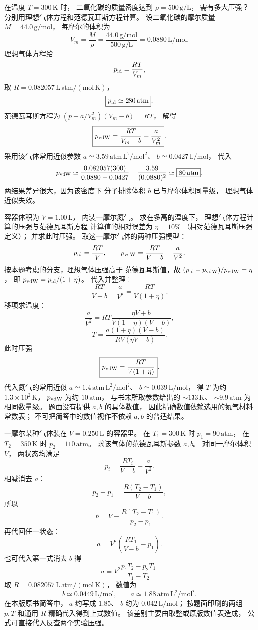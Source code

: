 在温度 $T=300\,\mathrm K$ 时，
二氧化碳的质量密度达到
$\rho=500\,\mathrm{g/L}$，
需有多大压强？
分别用理想气体方程和范德瓦耳斯方程计算。
\exsolution
设二氧化碳的摩尔质量
$M=44.0\,\mathrm{g/mol}$，
每摩尔的体积为
\[
V_m=\frac M\rho
=\frac{44.0\,\mathrm{g/mol}}{500\,\mathrm{g/L}}
=0.0880\,\mathrm{L/mol}.
\]
理想气体方程给
\[
p_{\rm id}=\frac{RT}{V_m},
\]
取 $R=0.082057\,\mathrm{L\,atm/(mol\,K)}$，
\[
\boxed{p_{\rm id}\simeq280\,\mathrm{atm}}.
\]
范德瓦耳斯方程为
$(p+a/V_m^2)(V_m-b)=RT$，
解得
\[
\boxed{p_{\rm vdW}=
\frac{RT}{V_m-b}-\frac{a}{V_m^2}}.
\]
采用该气体常用近似参数
$a\simeq3.59\,\mathrm{atm\,L^2/mol^2}$、
$b\simeq0.0427\,\mathrm{L/mol}$，
代入
\[
p_{\rm vdW}
\simeq\frac{0.082057(300)}{0.0880-0.0427}
-\frac{3.59}{(0.0880)^2}
\simeq\boxed{80\,\mathrm{atm}}.
\]
\excheck 两结果差异很大，因为该密度下
分子排除体积 $b$ 已与摩尔体积同量级，
理想气体近似失效。

容器体积为 $V=1.00\,\mathrm L$，
内装一摩尔氮气。
求在多高的温度下，
理想气体方程计算的压强与范德瓦耳斯方程
计算值的相对误差为 $\eta=10\%$
（相对范德瓦耳斯压强定义）；
并求此时压强。
\exsolution
取这一摩尔气体的两种压强模型：
\[
p_{\rm id}=\frac{RT}{V},\qquad
p_{\rm vdW}=\frac{RT}{V-b}-\frac a{V^2}.
\]
按本题考虑的分支，理想气体压强高于
范德瓦耳斯值，故
$(p_{\rm id}-p_{\rm vdW})/p_{\rm vdW}=\eta$，
即
$p_{\rm vdW}=p_{\rm id}/(1+\eta)$。
代入并整理：
\[
\frac{RT}{V-b}-\frac a{V^2}
=\frac{RT}{V(1+\eta)}.
\]
移项求温度：
\[
\frac a{V^2}
=RT\frac{\eta V+b}{V(1+\eta)(V-b)},
\]
\[
\boxed{
T=\frac{a(1+\eta)(V-b)}
{R V(\eta V+b)}}.
\]
此时压强
\[
\boxed{p_{\rm vdW}=\frac{RT}{V(1+\eta)}}.
\]
代入氮气的常用近似
$a\simeq1.4\,\mathrm{atm\,L^2/mol^2}$、
$b\simeq0.039\,\mathrm{L/mol}$，
得 $T$ 为约 $1.3\times10^2\,\mathrm K$，
$p_{\rm vdW}$ 为约 $10\,\mathrm{atm}$，
与书末所取参数给出的
$\sim133\,\mathrm K$、
$\sim9.9\,\mathrm{atm}$ 为相同数量级。
\excheck 题面没有提供 $a,b$ 的具体数值，
因此精确数值依赖选用的氮气材料常数表；
不可把简答中的数值视作不依赖 $a,b$ 的普适结果。

一摩尔某种气体装在
$V=0.250\,\mathrm L$ 的容器里。
在 $T_1=300\,\mathrm K$ 时
$p_1=90\,\mathrm{atm}$，
在 $T_2=350\,\mathrm K$ 时
$p_2=110\,\mathrm{atm}$。
求该气体的范德瓦耳斯参数 $a,b$。
\exsolution
对同一摩尔体积 $V$，
两状态均满足
\[
p_i=\frac{RT_i}{V-b}-\frac a{V^2}.
\]
相减消去 $a$：
\[
p_2-p_1=\frac{R(T_2-T_1)}{V-b},
\]
所以
\[
\boxed{b=V-\frac{R(T_2-T_1)}{p_2-p_1}}.
\]
再代回任一状态：
\[
\boxed{a=V^2\left(\frac{RT_1}{V-b}-p_1\right)}.
\]
也可代入第一式消去 $b$ 得
\[
a=V^2
\frac{p_1T_2-p_2T_1}{T_1-T_2}.
\]
取 $R=0.082057\,\mathrm{L\,atm/(mol\,K)}$，
数值为
\[
\boxed{b\simeq0.0449\,\mathrm{L/mol}},\qquad
\boxed{a\simeq1.88\,\mathrm{atm\,L^2/mol^2}}.
\]
\excheck 在本版原书简答中，
$a$ 约写成 $1.85$、
$b$ 约为 $0.042\,\mathrm{L/mol}$；
按题面印刷的两组 $p,T$ 和通用 $R$
精确代入得到上式数值。
该差别主要由取整或原版数值表造成，
公式可直接代入反查两个实验压强。

